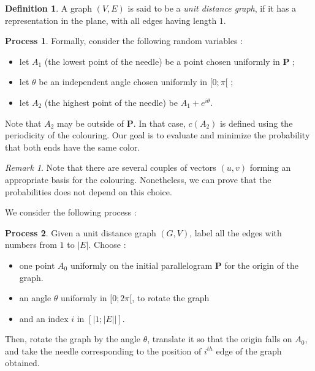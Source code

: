\documentclass[a4paper,11pt]{article}
\theoremstyle{definition}
\newtheorem{definition}{Definition}
\newtheorem{process}{Process}
\theoremstyle{remark}
\newtheorem{remark}{Remark}
\begin{document}
\begin{definition}
A graph $(V,E) $ is said to be a \emph{unit distance graph}, if it has a representation in the plane, with all edges having length $1$.
\end{definition}


\begin{process}
Formally, consider the following random variables :
\begin{itemize}
  \item let $A_1$ (the lowest point of the needle) be a point chosen uniformly in $\mathbf{P}$ ;
  \item let $\theta$ be an independent angle chosen uniformly in $[0;\pi[$ ;
  \item let $A_2$ (the highest point of the needle) be $A_1 + e^{i \theta}$.
\end{itemize}
\end{process}

Note that $A_2$ may be outside of $\mathbf{P}$. In that case, $c(A_2)$ is defined using the periodicity of the colouring.
Our goal is to evaluate and minimize the probability that both ends have the same color.

\begin{remark}
Note that there are several couples of vectors $(u,v)$ forming an appropriate basis for the 
colouring. Nonetheless, we can prove that the probabilities does not depend on this choice. 
\end{remark}


We consider the following process : \\
\begin{process}
Given a unit distance graph $(G,V)$, label all the edges with numbers from $1$ to $|E|$. Choose : 
\begin{itemize}
\item one point $A_0$ uniformly on the initial parallelogram $\mathbf{P}$ for the origin of the graph.
\item an angle $\theta$ uniformly in $[0;2\pi[$, to rotate the graph
\item and an index $i$ in $[|1;|E||]$.
\end{itemize}
Then, rotate the graph by the angle $\theta$, translate it so that the origin falls on  $A_0$, and take the needle corresponding to the position of $i^{th}$ edge of the graph obtained. 
\end{process}
\vspace{1 cm} 
\end{document}
